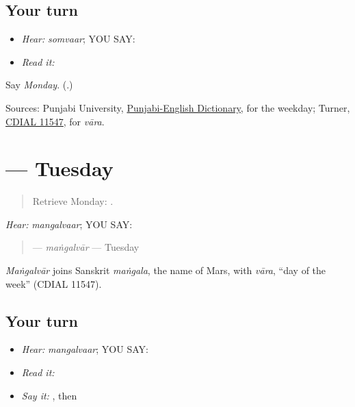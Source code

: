 \subsection*{Your turn}
\begin{itemize}
\raggedright
  \item \emph{Hear:} \emph{somvaar}; YOU SAY: \textbf{}
  \item \emph{Read it:} \textbf{}
\end{itemize}

\begin{tcolorbox}[breakable,colback=teal!4,colframe=teal!35!black,title={Before you move on}]
Say \emph{Monday}. (\textbf{}.)

Sources: Punjabi University, \href{https://dic.learnpunjabi.org/default.aspx?look=\%E0\%A8\%B8\%E0\%A9\%8B\%E0\%A8\%AE\%E0\%A8\%B5\%E0\%A8\%BE\%E0\%A8\%B0}{Punjabi-English Dictionary}, for the weekday; Turner, \href{https://dsal.uchicago.edu/dictionaries/soas/}{CDIAL 11547}, for \emph{vāra}.
\end{tcolorbox}
\section[\texorpdfstring{\pa{ਮੰਗਲਵਾਰ} (mangalvaar)}{ਮੰਗਲਵਾਰ (mangalvaar)}]{ — Tuesday}

\label{lesson:PA-C182-mangalvar}



\begin{quote}
Retrieve Monday: \textbf{}.
\end{quote}

\begin{grammarlens}[title={Grammar Lens: one weekday by ear}]
\emph{Hear:} \emph{mangalvaar}; YOU SAY: \textbf{}

\begin{quote}
\textbf{} — \emph{maṅgalvār} — Tuesday
\end{quote}
\end{grammarlens}

\begin{cousinweb}
\emph{Maṅgalvār} joins Sanskrit \emph{maṅgala}, the name of Mars, with \emph{vāra}, \textquotedblleft{}day of the week\textquotedblright{} (CDIAL 11547).
\end{cousinweb}

\subsection*{Your turn}
\begin{itemize}
\raggedright
  \item \emph{Hear:} \emph{mangalvaar}; YOU SAY: \textbf{}
  \item \emph{Read it:} \textbf{}
  \item \emph{Say it:} \textbf{}, then \textbf{}
\end{itemize}


